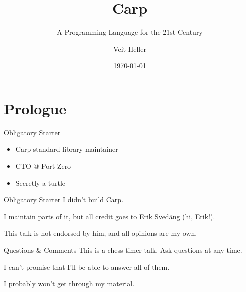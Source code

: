 \documentclass[14pt,aspectratio=169]{beamer}
\title{Carp}
\subtitle{A Programming Language for the 21st Century}
\date{\today}
\author{Veit Heller}
\institute{Port Zero}
\begin{document}
  \maketitle
  \section{Prologue}
  \begin{frame}{Obligatory Starter}
    \begin{itemize}
      \item Carp standard library maintainer
      \item CTO @ Port Zero
      \item Secretly a turtle
    \end{itemize}
  \end{frame}
  \begin{frame}{Obligatory Starter}
    I didn’t build Carp.
    \linebreak

    I maintain parts of it, but all credit goes to Erik Svedäng (hi, Erik!).
    \linebreak

    This talk is not endorsed by him, and all opinions are my own.
  \end{frame}
  \begin{frame}{Questions \& Comments}
    This is a chess-timer talk. Ask questions at any time.
    \linebreak

    I can’t promise that I’ll be able to answer all of them.
    \linebreak

    I probably won’t get through my material.
  \end{frame}
\end{document}
